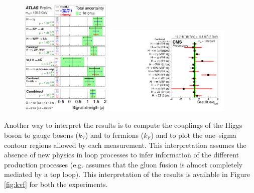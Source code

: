 \begin{figure}
        \centering
	\includegraphics[width=0.39\textwidth]{1_Introduction_Th_and_Exp/pics/fig_01.pdf}
	\includegraphics[width=0.54\textwidth]{1_Introduction_Th_and_Exp/pics/sqr_mlz_ccc_mH125.pdf}
       \caption{ }
       \label{fig:combination}
\end{figure}

Another way to interpret the results is to compute the couplings of the Higgs boson to gauge bosons ($k_V$) and to fermions ($k_F$) and to plot the one--sigma contour regions allowed by each measurement. This interpretation assumes the absence of new physics in loop processes to infer information of the different production processes (e.g. assumes that the gluon fusion is almost completely mediated by a top loop). This interpretation of the results is available in Figure \ref{fig:kvf} for both the experiments.

